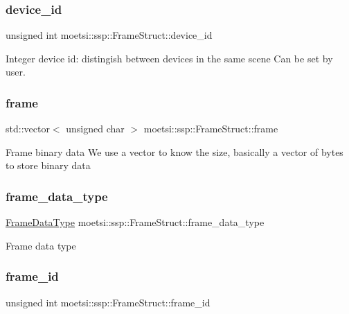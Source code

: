 \subsubsection{\texorpdfstring{device\+\_\+id}{device\_id}}
{\footnotesize\ttfamily unsigned int moetsi\+::ssp\+::\+Frame\+Struct\+::device\+\_\+id}

Integer device id\+: distingish between devices in the same scene Can be set by user. \mbox{\label{structmoetsi_1_1ssp_1_1FrameStruct_a7556ce8749c65cd5b22ea9c7a4c17619}} 
\subsubsection{\texorpdfstring{frame}{frame}}
{\footnotesize\ttfamily std\+::vector$<$ unsigned char $>$ moetsi\+::ssp\+::\+Frame\+Struct\+::frame}

Frame binary data We use a vector to know the size, basically a vector of bytes to store binary data \mbox{\label{structmoetsi_1_1ssp_1_1FrameStruct_a281ef582bcbb8b6b3d0f0eb3efd615c6}} 
\subsubsection{\texorpdfstring{frame\+\_\+data\+\_\+type}{frame\_data\_type}}
{\footnotesize\ttfamily \hyperlink{namespacemoetsi_1_1ssp_aa9b059f0bc7a91855545ee887f2d56c4}{Frame\+Data\+Type} moetsi\+::ssp\+::\+Frame\+Struct\+::frame\+\_\+data\+\_\+type}

Frame data type \mbox{\label{structmoetsi_1_1ssp_1_1FrameStruct_aebc84f95b5024225412d92a56ddf24ad}} 
\subsubsection{\texorpdfstring{frame\+\_\+id}{frame\_id}}
{\footnotesize\ttfamily unsigned int moetsi\+::ssp\+::\+Frame\+Struct\+::frame\+\_\+id}


